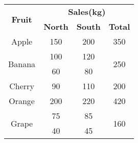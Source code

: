 \documentclass{report}
\begin{document}
\begin{center}
    \begin{tabular}{|c|c|c|c|}
         \hline
         \multirow{2}{*}{\textbf{Fruit}} & \multicolumn{3}{|c|}{\textbf{Sales(kg) }} \\
         \cline{2-4}
         & \textbf{North} & \textbf{South} & \textbf{Total} \\
         \hline
         Apple & 150 & 200 & 350  \\
         \hline
        \multirow{2}{*}{Banana} & 100 & 120 & \multirow{2}{*}{250} \\
        \cline{2-3}
        & 60 & 80 & \\
        \hline
        Cherry & 90 & 110 & 200 \\
        \hline
        Orange & 200 & 220 & 420 \\
        \hline
        \multirow{2}{*}{Grape} & 75 & 85 & \multirow{2}{*}{160} \\
        \cline{2-3}
        & 40 & 45 & \\
        \hline
        \end{tabular}
\end{center}    
\end{document}
